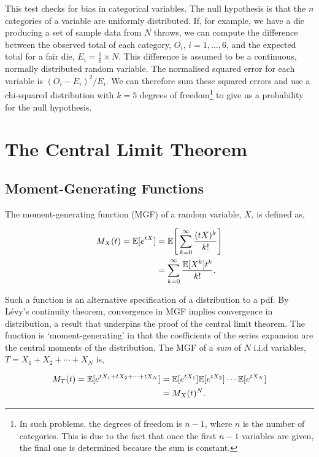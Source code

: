 \documentclass[11pt]{amsart}
\begin{document}
This test checks for bias in categorical variables. The null hypothesis is that the $n$ categories of a variable are uniformly distributed. If, for example, we have a die producing a set of sample data from $N$ throws, we can compute the difference between the observed total of each category, $O_i$, $i = 1, \dots, 6$, and the expected total for a fair die, $E_i = \frac{1}{6}\times N$. This difference is assumed to be a continuous, normally distributed random variable. The normalised squared error for each variable is $(O_i - E_i)^2/E_i$. We can therefore sum these squared errors and use a chi-squared distribution with $k = 5$ degrees of freedom\footnote{In such problems, the degrees of freedom is $n - 1$, where $n$ is the number of categories. This is due to the fact that once the first $n-1$ variables are given, the final one is determined because the sum is constant.} to give us a probability for the null hypothesis.

\section{The Central Limit Theorem}
\subsection{Moment-Generating Functions}

The moment-generating function (MGF) of a random variable, $X$, is defined as,

\begin{align}
M_X(t) = \mathbb{E}[e^{tX}] &= \mathbb{E}\Bigg[\sum_{k = 0}^{\infty} \frac{(tX)^k}{k!}\Bigg] \notag \\
&= \sum_{k = 0}^{\infty} \frac{\mathbb{E}[X^k]t^k}{k!}. \notag
\end{align}

Such a function is an alternative specification of a distribution to a pdf. By L\'evy's continuity theorem, convergence in MGF implies convergence in distribution, a result that underpins the proof of the central limit theorem. The function is `moment-generating' in that the coefficients of the series expansion are the central moments of the distribution. The MGF of a \emph{sum} of $N$ i.i.d variables, $T = X_1 + X_2 + \cdots + X_N$ is,

\begin{align}
M_T(t) = \mathbb{E}[e^{tX_1 + tX_2 + \cdots + tX_N}] &= \mathbb{E}[e^{tX_1}]\mathbb{E} [e^{tX_2}] \cdots\mathbb{E}[e^{tX_N}] \notag \\
&= M_X(t)^N. \notag
\end{align}
\end{document}

